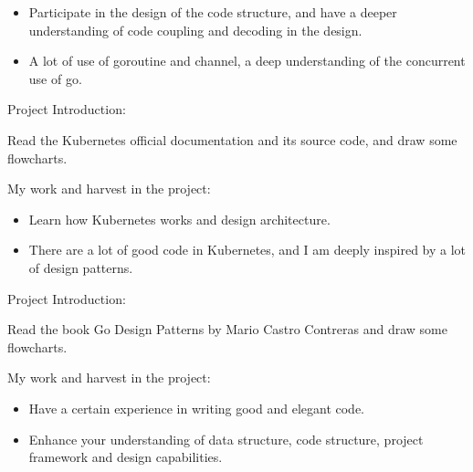 \documentclass{resume}
\begin{document}
\begin{itemize}[parsep=1ex]
	\item Participate in the design of the code structure, and have a deeper understanding of code coupling and decoding in the design.
	\item A lot of use of goroutine and channel, a deep understanding of the concurrent use of go.
\end{itemize}


\vspace{1mm}\par
\noindent
Project Introduction:

\vspace{1mm}\par
\setlength{\parindent}{2ex}
Read the Kubernetes official documentation and its source code, and draw some flowcharts.

\vspace{1mm}\par
\noindent
My work and harvest in the project:

\begin{itemize}[parsep=1ex]
	\item Learn how Kubernetes works and design architecture.
	\item There are a lot of good code in Kubernetes, and I am deeply inspired by a lot of design patterns.
\end{itemize}


\vspace{1mm}\par
\noindent
Project Introduction:

\vspace{1mm}\par
\setlength{\parindent}{2ex}
Read the book Go Design Patterns by Mario Castro Contreras and draw some flowcharts.

\vspace{1mm}\par
\noindent
My work and harvest in the project:

\begin{itemize}[parsep=1ex]
	\item Have a certain experience in writing good and elegant code.
	\item Enhance your understanding of data structure, code structure, project framework and design capabilities.
\end{itemize}
\end{document}
